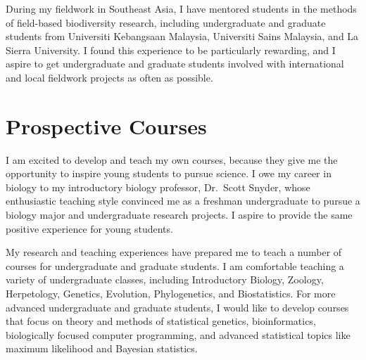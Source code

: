 During my fieldwork in Southeast Asia, I have mentored students in the methods
of field-based biodiversity research, including undergraduate and graduate
students from Universiti Kebangsaan Malaysia, Universiti Sains Malaysia, and La
Sierra University.
I found this experience to be particularly rewarding, and I aspire to get
undergraduate and graduate students involved with international and local
fieldwork projects as often as possible.

\section*{Prospective Courses}

I am excited to develop and teach my own courses, because they give me the
opportunity to inspire young students to pursue science.
I owe my career in biology to my introductory biology professor, Dr.\ Scott
Snyder, whose enthusiastic teaching style convinced me as a freshman
undergraduate to pursue a biology major and undergraduate research projects.
I aspire to provide the same positive experience for young students.

My research and teaching experiences have prepared me to teach a number of
courses for undergraduate and graduate students.
I am comfortable teaching a variety of undergraduate classes, including
Introductory Biology, Zoology, Herpetology, Genetics, Evolution, Phylogenetics,
and Biostatistics.
For more advanced undergraduate and graduate students, I would like to develop
courses that focus on theory and methods of statistical genetics,
bioinformatics, biologically focused computer programming, and advanced
statistical topics like maximum likelihood and Bayesian statistics.

